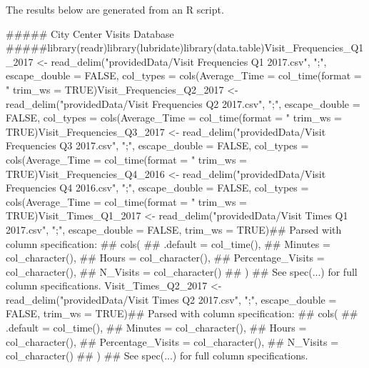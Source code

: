\documentclass{article}\usepackage[]{graphicx}\usepackage[]{color}
\begin{document}
\title{\title{}}



\maketitle
The results below are generated from an R script.

##### City Center Visits Database #####library(readr)library(lubridate)library(data.table)Visit_Frequencies_Q1_2017 <- read_delim("providedData/Visit Frequencies Q1 2017.csv",
                                        ";", escape_double = FALSE, 
                                        col_types = cols(Average_Time = col_time(format = "%
                                        trim_ws = TRUE)Visit_Frequencies_Q2_2017 <- read_delim("providedData/Visit Frequencies Q2 2017.csv",
                                        ";", escape_double = FALSE, 
                                        col_types = cols(Average_Time = col_time(format = "%
                                        trim_ws = TRUE)Visit_Frequencies_Q3_2017 <- read_delim("providedData/Visit Frequencies Q3 2017.csv",
                                        ";", escape_double = FALSE, 
                                        col_types = cols(Average_Time = col_time(format = "%
                                        trim_ws = TRUE)Visit_Frequencies_Q4_2016 <- read_delim("providedData/Visit Frequencies Q4 2016.csv",
                                        ";", escape_double = FALSE, 
                                        col_types = cols(Average_Time = col_time(format = "%
                                        trim_ws = TRUE)Visit_Times_Q1_2017 <- read_delim("providedData/Visit Times Q1 2017.csv",
                                  ";", escape_double = FALSE, 
                                  trim_ws = TRUE)## Parsed with column specification:
## cols(
##   .default = col_time(),
##   Minutes = col_character(),
##   Hours = col_character(),
##   Percentage_Visits = col_character(),
##   N_Visits = col_character()
## )
## See spec(...) for full column specifications.
Visit_Times_Q2_2017 <- read_delim("providedData/Visit Times Q2 2017.csv",
                                  ";", escape_double = FALSE, 
                                  trim_ws = TRUE)## Parsed with column specification:
## cols(
##   .default = col_time(),
##   Minutes = col_character(),
##   Hours = col_character(),
##   Percentage_Visits = col_character(),
##   N_Visits = col_character()
## )
## See spec(...) for full column specifications.
\end{document}

